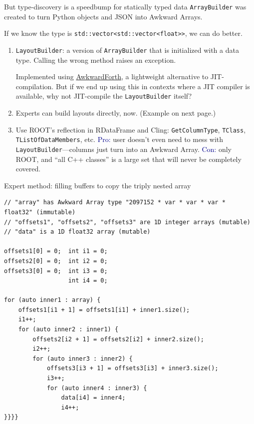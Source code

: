 \documentclass[aspectratio=169]{beamer}
\begin{document}
\begin{frame}{But type-discovery is a speedbump for statically typed data}
\vspace{0.35 cm}
\texttt{ArrayBuilder} was created to turn Python objects and JSON into Awkward Arrays.

\vspace{0.25 cm}
If we know the type is \texttt{std::vector<std::vector<float>>}, we can do better.

\vspace{0.25 cm}
\begin{enumerate}\setlength{\itemsep}{0.3 cm}
\item<2-> \texttt{LayoutBuilder}: a version of \texttt{ArrayBuilder} that is initialized with a data type. Calling the wrong method raises an exception.

\vspace{0.2 cm}
Implemented using \textcolor{blue}{\href{https://arxiv.org/abs/2102.13516}{AwkwardForth}}, a lightweight alternative to JIT-compilation. But if we end up using this in contexts where a JIT compiler is available, why not JIT-compile the \texttt{LayoutBuilder} itself?

\item<3-> Experts can build layouts directly, now. (Example on next page.)

\item<4-> Use ROOT's reflection in RDataFrame and Cling: \texttt{GetColumnType}, \texttt{TClass}, \texttt{TListOfDataMembers}, etc. \textcolor{darkblue}{Pro:} user doesn't even need to mess with \texttt{LayoutBuilder}---columns just turn into an Awkward Array. \textcolor{darkblue}{Con:} only ROOT, and ``all C++ classes'' is a large set that will never be completely covered.
\end{enumerate}
\end{frame}

\begin{frame}[fragile]{Expert method: filling buffers to copy the triply nested array}
\vspace{0.25 cm}
\scriptsize
\begin{verbatim}
// "array" has Awkward Array type "2097152 * var * var * var * float32" (immutable)
// "offsets1", "offsets2", "offsets3" are 1D integer arrays (mutable)
// "data" is a 1D float32 array (mutable)

offsets1[0] = 0;  int i1 = 0;
offsets2[0] = 0;  int i2 = 0;
offsets3[0] = 0;  int i3 = 0;
                  int i4 = 0;

for (auto inner1 : array) {
    offsets1[i1 + 1] = offsets1[i1] + inner1.size();
    i1++;
    for (auto inner2 : inner1) {
        offsets2[i2 + 1] = offsets2[i2] + inner2.size();
        i2++;
        for (auto inner3 : inner2) {
            offsets3[i3 + 1] = offsets3[i3] + inner3.size();
            i3++;
            for (auto inner4 : inner3) {
                data[i4] = inner4;
                i4++;
}}}}
\end{verbatim}
\end{frame}
\end{document}
